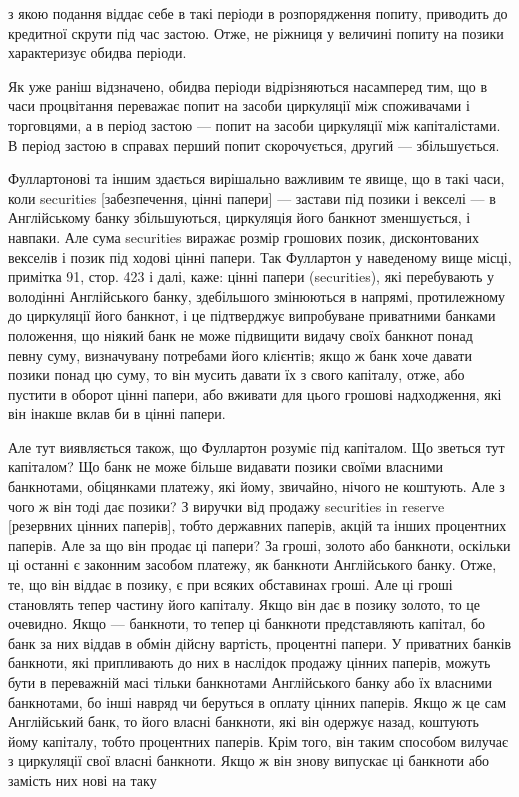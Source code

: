 \parcont{}  %
з якою подання віддає себе в такі періоди в розпорядження
попиту, приводить до кредитної скрути під час застою. Отже,
не ріжниця у величині попиту на позики характеризує обидва
періоди.

Як уже раніш відзначено, обидва періоди відрізняються насамперед
тим, що в часи процвітання переважає попит на
засоби циркуляції між споживачами і торговцями, а в період
застою — попит на засоби циркуляції між капіталістами. В період
застою в справах перший попит скорочується, другий — збільшується.

Фуллартонові та іншим здається вирішально важливим те явище,
що в такі часи, коли securities [забезпечення, цінні папери] — застави
під позики і векселі — в Англійському банку збільшуються,
циркуляція його банкнот зменшується, і навпаки. Але сума securities
виражає розмір грошових позик, дисконтованих векселів і
позик під ходові цінні папери. Так Фуллартон у наведеному вище
місці, примітка 91, стор. 423 і далі, каже: цінні папери (securities),
які перебувають у володінні Англійського банку, здебільшого змінюються
в напрямі, протилежному до циркуляції його банкнот,
і це підтверджує випробуване приватними банками положення,
що ніякий банк не може підвищити видачу своїх банкнот
понад певну суму, визначувану потребами його клієнтів; якщо ж
банк хоче давати позики понад цю суму, то він мусить давати
їх з свого капіталу, отже, або пустити в оборот цінні папери,
або вживати для цього грошові надходження, які він інакше
вклав би в цінні папери.

Але тут виявляється також, що Фуллартон розуміє під капіталом.
Що зветься тут капіталом? Що банк не може більше
видавати позики своїми власними банкнотами, обіцянками платежу,
які йому, звичайно, нічого не коштують. Але з чого ж
він тоді дає позики? З виручки від продажу securities in reserve
[резервних цінних паперів], тобто державних паперів, акцій та
інших процентних паперів. Але за що він продає ці папери?
За гроші, золото або банкноти, оскільки ці останні є законним
засобом платежу, як банкноти Англійського банку. Отже, те,
що він віддає в позику, є при всяких обставинах гроші. Але
ці гроші становлять тепер частину його капіталу. Якщо він дає
в позику золото, то це очевидно. Якщо — банкноти, то тепер ці
банкноти представляють капітал, бо банк за них віддав в обмін
дійсну вартість, процентні папери. У приватних банків банкноти,
які припливають до них в наслідок продажу цінних паперів,
можуть бути в переважній масі тільки банкнотами Англійського
банку або їх власними банкнотами, бо інші навряд чи беруться
в оплату цінних паперів. Якщо ж це сам Англійський банк,
то його власні банкноти, які він одержує назад, коштують
йому капіталу, тобто процентних паперів. Крім того, він таким
способом вилучає з циркуляції свої власні банкноти. Якщо ж
він знову випускає ці банкноти або замість них нові на таку
\parbreak{}  %
